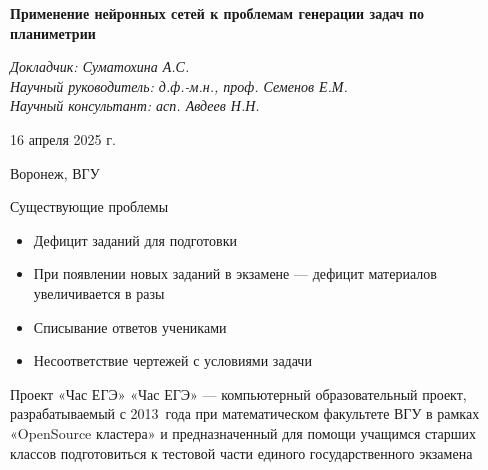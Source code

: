 \documentclass[aspectratio=169,12pt]{beamer}
\begin{document}
\begin{frame}
	\begin{center}
		\vspace{1cm}
		\Large\textcolor{NordBrightBlue}{\textbf{Применение нейронных сетей к проблемам генерации
				задач по планиметрии}}\\
	\end{center}
	\vspace{0.5cm}
	\large\textcolor{NordBlue}{\textit{Докладчик: Суматохина А.С.}}\\
	\large\textcolor{NordBlue}{\textit{Научный руководитель: д.ф.-м.н., проф. Семенов Е.М.}}\\
	\large\textcolor{NordBlue}{\textit{Научный консультант: асп. Авдеев Н.Н.}}\\
	\vspace{0.5cm}
	\begin{center}
		16 апреля 2025 г.
	\end{center}
	\begin{center}
		Воронеж, ВГУ
	\end{center}

\end{frame}

\begin{frame}{Существующие проблемы}
	\begin{itemize}
		\item Дефицит заданий для подготовки
		\item При появлении новых заданий в экзамене — дефицит материалов увеличивается в разы
		\item Списывание ответов учениками
		\item Несоответствие чертежей с условиями задачи
	\end{itemize}
\end{frame}

\begin{frame}{Проект «Час ЕГЭ»}
	\large
	«Час ЕГЭ» — компьютерный образовательный проект, разрабатываемый с 2013~года при математическом факультете ВГУ в рамках «OpenSource кластера» и предназначенный для помощи учащимся старших классов подготовиться к тестовой части единого государственного экзамена
\end{frame}
\end{document}
